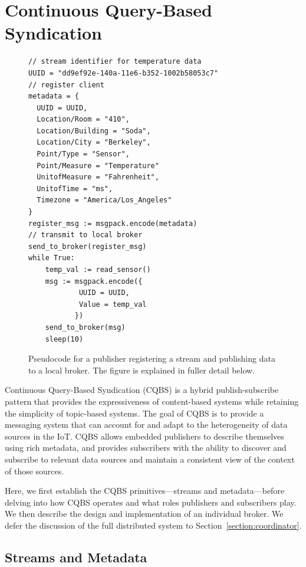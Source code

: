 \section{Continuous Query-Based Syndication}

\begin{figure}[ht]
\centering
\begin{lstlisting}[language=pseudocode,basicstyle=\small]
// stream identifier for temperature data
UUID = "dd9ef92e-140a-11e6-b352-1002b58053c7"
// register client
metadata = {
  UUID = UUID,
  Location/Room = "410",
  Location/Building = "Soda",
  Location/City = "Berkeley",
  Point/Type = "Sensor",
  Point/Measure = "Temperature"
  UnitofMeasure = "Fahrenheit",
  UnitofTime = "ms",
  Timezone = "America/Los_Angeles"
}
register_msg := msgpack.encode(metadata)
// transmit to local broker
send_to_broker(register_msg)
while True:
    temp_val := read_sensor()
    msg := msgpack.encode({
            UUID = UUID,
            Value = temp_val
           })
    send_to_broker(msg)
    sleep(10)
\end{lstlisting}
\caption{Pseudocode for a publisher registering a stream and publishing data to a local broker. The figure is explained in fuller detail below.}
\label{fig:pseudoclient}
\end{figure}


Continuous Query-Based Syndication (CQBS) is a hybrid publish-subscribe pattern that provides the expressiveness of content-based systems while retaining the simplicity of topic-based systems.
The goal of CQBS is to provide a messaging system that can account for and adapt to the heterogeneity of data sources in the IoT.
CQBS allows embedded publishers to describe themselves using rich metadata, and provides subscribers with the ability to discover and subscribe to relevant data sources and maintain a consistent view of the context of those sources.

Here, we first establish the CQBS primitives---streams and metadata---before delving into how CQBS operates and what roles publishers and subscribers play.
We then describe the design and implementation of an individual broker. 
We defer the discussion of the full distributed system to Section~\ref{section:coordinator}.

\subsection{Streams and Metadata}

